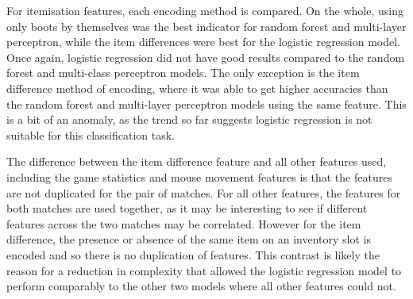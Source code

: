 \documentclass[Report.tex]{subfiles}
\begin{document}
For itemisation features, each encoding method is compared. On the whole, using only boots by themselves was the best indicator for random forest and multi-layer perceptron, while the item differences were best for the logistic regression model. Once again, logistic regression did not have good results compared to the random forest and multi-class perceptron models. The only exception is the item difference method of encoding, where it was able to get higher accuracies than the random forest and multi-layer perceptron models using the same feature. This is a bit of an anomaly, as the trend so far suggests logistic regression is not suitable for this classification task. 

The difference between the item difference feature and all other features used, including the game statistics and mouse movement features is that the features are not duplicated for the pair of matches. For all other features, the features for both matches are used together, as it may be interesting to see if different features across the two matches may be correlated. However for the item difference, the presence or absence of the same item on an inventory slot is encoded and so there is no duplication of features. This contrast is likely the reason for a reduction in complexity that allowed the logistic regression model to perform comparably to the other two models where all other features could not.
\end{document}
